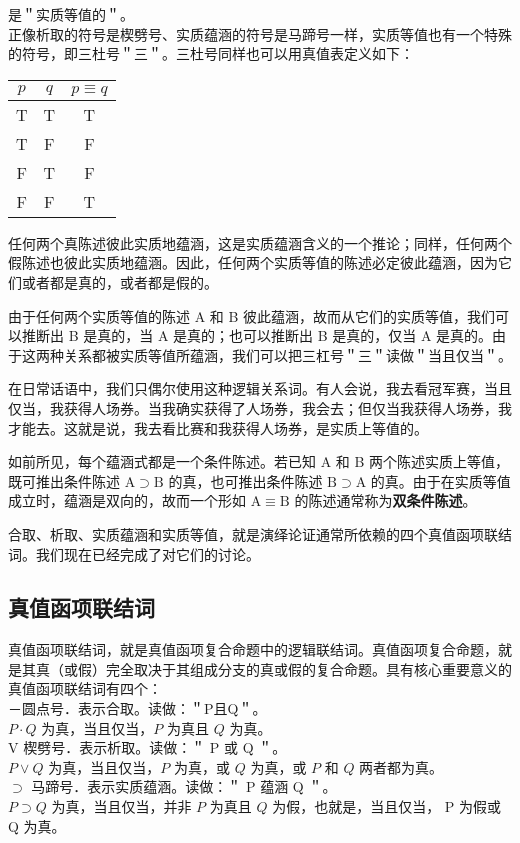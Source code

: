 是＂实质等值的＂。\\
正像析取的符号是楔劈号、实质蕴涵的符号是马蹄号一样，实质等值也有一个特殊的符号，即三杜号＂三＂。三杜号同样也可以用真值表定义如下：

\begin{center}
\begin{tabular}{|ccc|}
\hline
$p$ & $q$ & $p \equiv q$ \\
\hline
T & T & T \\
T & F & F \\
F & T & F \\
F & F & T \\
\hline
\end{tabular}
\end{center}

任何两个真陈述彼此实质地蕴涵，这是实质蕴涵含义的一个推论；同样，任何两个假陈述也彼此实质地蕴涵。因此，任何两个实质等值的陈述必定彼此蕴涵，因为它们或者都是真的，或者都是假的。

由于任何两个实质等值的陈述 A 和 B 彼此蕴涵，故而从它们的实质等值，我们可以推断出 B 是真的，当 A 是真的；也可以推断出 B 是真的，仅当 A 是真的。由于这两种关系都被实质等值所蕴涵，我们可以把三杠号＂三＂读做＂当且仅当＂。

在日常话语中，我们只偶尔使用这种逻辑关系词。有人会说，我去看冠军赛，当且仅当，我获得人场券。当我确实获得了人场券，我会去；但仅当我获得人场券，我才能去。这就是说，我去看比赛和我获得人场券，是实质上等值的。

如前所见，每个蕴涵式都是一个条件陈述。若已知 A 和 B 两个陈述实质上等值，既可推出条件陈述 $\mathrm{A} \supset \mathrm{B}$ 的真，也可推出条件陈述 $\mathrm{B} \supset \mathrm{A}$ 的真。由于在实质等值成立时，蕴涵是双向的，故而一个形如 $\mathrm{A} \equiv \mathrm{B}$ 的陈述通常称为\textbf{双条件陈述}。

合取、析取、实质蕴涵和实质等值，就是演绎论证通常所依赖的四个真值函项联结词。我们现在已经完成了对它们的讨论。

\subsection{真值函项联结词}
真值函项联结词，就是真值函项复合命题中的逻辑联结词。真值函项复合命题，就是其真（或假）完全取决于其组成分支的真或假的复合命题。具有核心重要意义的真值函项联结词有四个：\\
－圆点号．表示合取。读做：＂P且Q＂。\\
$P \cdot Q$ 为真，当且仅当，$P$ 为真且 $Q$ 为真。\\
V 楔劈号．表示析取。读做：＂ P 或 Q ＂。\\
$P \vee Q$ 为真，当且仅当，$P$ 为真，或 $Q$ 为真，或 $P$ 和 $Q$ 两者都为真。\\
$\supset$ 马蹄号．表示实质蕴涵。读做：＂ P 蕴涵 Q ＂。\\
$P \supset Q$ 为真，当且仅当，并非 $P$ 为真且 $Q$ 为假，也就是，当且仅当， P 为假或 Q 为真。

